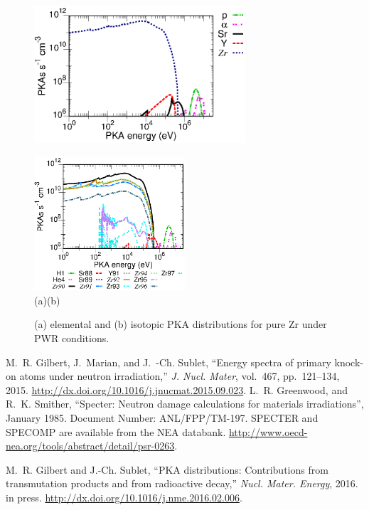 \documentclass[a4paper]{article}
\begin{document}
\begin{figure}[t]
\hskip-1.5cm
\parbox[b][7cm][t]{0.7\textwidth}{\includegraphics[width=0.7\textwidth]
{ZR_elemental}}%
\includegraphics[width=0.5\textwidth]
{ZR_isotope}\\
\vskip-1.0cm
\hskip-0.5cm(a)\hskip7.2cm(b)
\caption{\label{pka_graphs}(a) elemental and (b) isotopic PKA distributions for pure Zr under PWR conditions.}
\end{figure}

\begin{thebibliography}{10}

M.~R. Gilbert, J.~Marian, and J.~{\relax -Ch}. Sublet, ``Energy spectra of
  primary knock-on atoms under neutron irradiation,'' {\em J. Nucl. Mater},
  vol.~467, pp.~121--134, 2015.
\newblock \url{http://dx.doi.org/10.1016/j.jnucmat.2015.09.023}.
L.~R. Greenwood, and R.~K. Smither,
  ``Specter: Neutron damage calculations for materials
  irradiations'', January 1985. Document Number:
  ANL/FPP/TM-197. SPECTER and SPECOMP are available from the NEA databank.
\newblock \url{http://www.oecd-nea.org/tools/abstract/detail/psr-0263}.

M.~R. Gilbert and J.-{\relax Ch}. Sublet, ``{{PKA distributions: Contributions
  from transmutation products and from radioactive decay}},'' {\em Nucl. Mater.
  Energy}, 2016.
\newblock in press.  \newblock \url{http://dx.doi.org/10.1016/j.nme.2016.02.006}.



\end{thebibliography}
\end{document}
